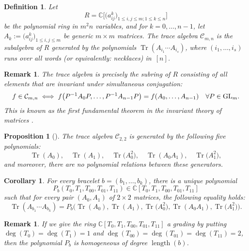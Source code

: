 \documentclass[pdftex]{sigma}
\numberwithin{equation}{section}
\newtheorem{Corollary}[Theorem]{Corollary}
\newtheorem{Proposition}[Theorem]{Proposition}
\newtheorem{Definition}[Theorem]{Definition}
\newtheorem{Remark}[Theorem]{Remark}
\DeclareMathOperator{\Tr}{Tr}
\newcommand{\CC}{\mathbb{C}}
\begin{document}
 \begin{Definition} \label{def:TraceAlgebra}
    Let
 \[
 R=\CC\big[\big(a_{ij}^k\big)_{1\leq i,j \leq m; 1 \leq k \leq n}\big]
  \]be the polynomial ring in $m^2n$ variables, and for $k=0, \dots, n-1$, let $A_k := \big(a_{ij}^k\big)_{1\leq i,j \leq m}$ be generic $m \times m$ matrices.
    The \emph{trace algebra} $\mathcal{C}_{m,n}$ is the subalgebra of $R$ generated by the polynomials $\Tr(A_{i_1}\cdots A_{i_s})$, where $(i_1,\dots,i_s)$ runs over all words (or equivalently: necklaces) in~$[n]$.
 \end{Definition}
 \begin{Remark}
    The trace algebra is precisely the subring of $R$ consisting of all elements that are invariant under simultaneous conjugation:
\[
    f \in \mathcal{C}_{m,n} \iff f\big(P^{-1}A_0P,\dots,P^{-1}A_{n-1}P\big) = f(A_0,\dots,A_{n-1}) \quad  \forall P \in {\rm GL}_m.
\]
    This is known as the \emph{first fundamental theorem} in the invariant theory of matrices \cite{procesi1976invariant, sibirskii1968algebraic}.
 \end{Remark}
 \begin{Proposition}[{\cite[Corollary 2]{sibirskii1968algebraic}}]
The trace algebra $\mathcal{C}_{2,2}$ is generated by the following five polynomials:
\[
\Tr(A_0), \quad \Tr(A_1),\quad \Tr\big(A_0^2\big),\quad \Tr(A_0A_1), \quad \Tr\big(A_1^2\big),
\]
and moreover, there are no polynomial relations between these generators.
 \end{Proposition}
 \begin{Corollary}
     For every bracelet $b=(b_1,\dots,b_k)$, there is a unique  polynomial
     \[
     P_b(T_0,T_1,T_{00},T_{01},T_{11}) \in \CC[T_0,T_1,T_{00},T_{01},T_{11}]
     \]
     such that for every pair $(A_0,A_1)$ of $2\times2$ matrices, the following equality holds:
     \begin{equation*} %
         \Tr(A_{b_1}\cdots A_{b_k}) = P_b\big(\Tr(A_0),\Tr(A_1), \Tr\big(A_0^2\big), \Tr(A_0A_1), \Tr\big(A_1^2\big)\big).
     \end{equation*}
 \end{Corollary}
 \begin{Remark} \label{rmk:multiHomog}
    If we give the ring $\CC[T_0,T_1,T_{00},T_{01},T_{11}]$ a grading by putting $\deg(T_0)=\deg(T_1)\allowbreak =1$ and $\deg(T_{00})=\deg(T_{01})=\deg(T_{11})=2$, then the polynomial $P_b$ is homogeneous of degree $\operatorname{length}(b)$.
 \end{Remark}
\end{document}
